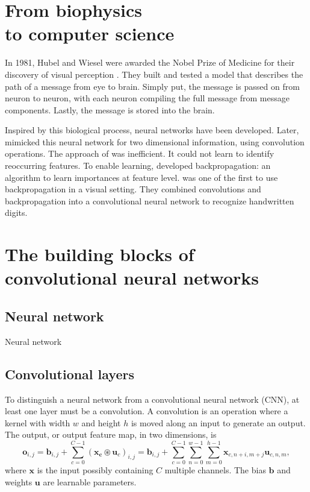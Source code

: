 
\chapter[From biophysics to computer science]{From biophysics \\ to computer science}

In 1981, Hubel and Wiesel were awarded the Nobel Prize of Medicine for their discovery of visual perception \cite{NP1981}.
They built and tested a model that describes the path of a message from eye to brain.
Simply put, the message is passed on from neuron to neuron, with each neuron compiling the full message from message components.
Lastly, the message is stored into the brain.

Inspired by this biological process, neural networks have been developed.
Later, \textcite{Fukushima1980} mimicked this neural network for two dimensional information, using convolution operations.
The approach of \citeauthor{Fukushima1980} was inefficient.
It could not learn to identify reoccurring features.
To enable learning, \textcite{Rumelhart1986} developed backpropagation: an algorithm to learn importances at feature level.
\textcite{LeCun1990} was one of the first to use backpropagation in a visual setting.
They combined convolutions and backpropagation into a convolutional neural network to recognize handwritten digits.


\chapter[CNN building blocks]{The building blocks of convolutional neural networks}

\section{Neural network}
Neural network

\section{Convolutional layers}
To distinguish a neural network from a convolutional neural network (CNN), at least one layer must be a convolution.
A convolution is an operation where a kernel with width $w$ and height $h$ is moved along an input to generate an output.
The output, or output feature map, in two dimensions, is
\begin{equation}
    \mathbf{o}_{i,j} = \mathbf{b}_{i,j} + \sum_{c=0}^{C-1}(\mathbf{x_c} \circledast \mathbf{u}_c)_{i,j}
    = \mathbf{b}_{i,j} + \sum_{c=0}^{C-1}\sum_{n=0}^{w-1}\sum_{m=0}^{h-1}\mathbf{x}_{c,n+i,m+j}\mathbf{u}_{c,n,m},
\end{equation}
where $\mathbf{x}$ is the input possibly containing $C$ multiple channels.
The bias $\mathbf{b}$ and weights $\mathbf{u}$ are learnable parameters.

